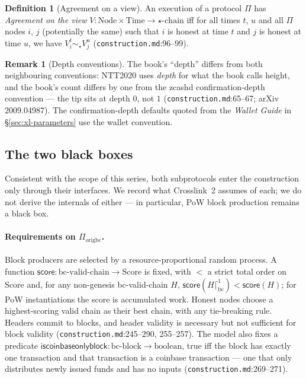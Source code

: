 \documentclass[11pt,a4paper]{article}
\theoremstyle{definition}
\newtheorem{definition}[theorem]{Definition}
\newtheorem{remark}[theorem]{Remark}
\begin{document}
\begin{definition}[Agreement on a view]\label{def:xl-agreement-view}
An execution of a protocol $\Pi$ has \emph{Agreement on the view} $V :
\mathrm{Node} \times \mathrm{Time} \to \text{$\star$-chain}$ iff for all
times $t$, $u$ and all $\Pi$ nodes $i$, $j$ (potentially the same) such
that $i$ is honest at time $t$ and $j$ is honest at time $u$, we have
$V_i^t \sim_{\star} V_j^u$ (\texttt{construction.md}:96--99).
\end{definition}

\begin{remark}[Depth conventions]\label{rem:xl-depth}
The book's ``depth'' differs from both neighbouring conventions: NTT2020
uses \emph{depth} for what the book calls height, and the book's count
differs by one from the zcashd confirmation-depth convention --- the tip
sits at depth $0$, not $1$ (\texttt{construction.md}:65--67; arXiv
2009.04987). The confirmation-depth defaults quoted from the
\emph{Wallet Guide} in \S\ref{sec:xl-parameters} use the wallet
convention.
\end{remark}

\subsection{The two black boxes}\label{sec:xl-blackboxes}

Consistent with the scope of this series, both subprotocols enter the
construction only through their interfaces. We record what Crosslink~2
assumes of each; we do not derive the internals of either --- in
particular, PoW block production remains a black box.

\paragraph{Requirements on $\Pi_{\mathrm{origbc}}$.} Block producers are
selected by a resource-proportional random process. A function
$\mathsf{score} : \text{bc-valid-chain} \to \mathrm{Score}$ is fixed, with
$<$ a strict total order on $\mathrm{Score}$ and, for any non-genesis
bc-valid-chain $H$, $\mathsf{score}(H \lceil^{1}_{\mathrm{bc}}) <
\mathsf{score}(H)$; for PoW instantiations the score is accumulated work.
Honest nodes choose a highest-scoring valid chain as their best chain,
with any tie-breaking rule. Headers commit to blocks, and header validity
is necessary but not sufficient for block validity
(\texttt{construction.md}:245--290, 255--257). The model also fixes a
predicate $\mathsf{iscoinbaseonlyblock} : \text{bc-block} \to
\mathrm{boolean}$, true iff the block has exactly one transaction and that
transaction is a coinbase transaction --- one that only distributes newly
issued funds and has no inputs (\texttt{construction.md}:269--271).
\end{document}
